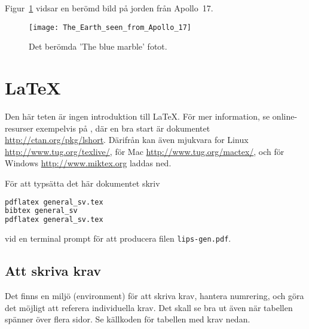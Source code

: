 \documentclass[10pt,oneside,swedish]{lips}
\begin{document}
Figur~\ref{fig:bluemarble} vidsar en berömd bild på jorden från Apollo~17.
\begin{figure}[htbp]
  \centering
  \texttt{[image: The\_Earth\_seen\_from\_Apollo\_17]}
  \caption{Det berömda 'The blue marble' fotot.}
  \label{fig:bluemarble}
\end{figure}

\section{\LaTeX{}}
Den här teten är ingen introduktion till \LaTeX{}. För mer
information, se online-resurser exempelvis på \citep{TUG}, där en bra
start är dokumentet \url{http://ctan.org/pkg/lshort}. Därifrån kan
även mjukvara for Linux
\url{http://www.tug.org/texlive/}, för Mac
\url{http://www.tug.org/mactex/}, och för Windows
\url{http://www.miktex.org} laddas ned.

För att typsätta det här dokumentet skriv
\begin{lstlisting}[language=sh,frame=single]
pdflatex general_sv.tex
bibtex general_sv
pdflatex general_sv.tex
\end{lstlisting}
vid en terminal prompt för att producera filen \texttt{lips-gen.pdf}.

\subsection{Att skriva krav}
\lipsum[7]

Det finns en miljö (environment) för att skriva krav, hantera
numrering, och göra det möjligt att referera individuella krav. Det
skall se bra ut även när tabellen spänner över flera sidor. Se
källkoden för tabellen med krav nedan.
\end{document}
